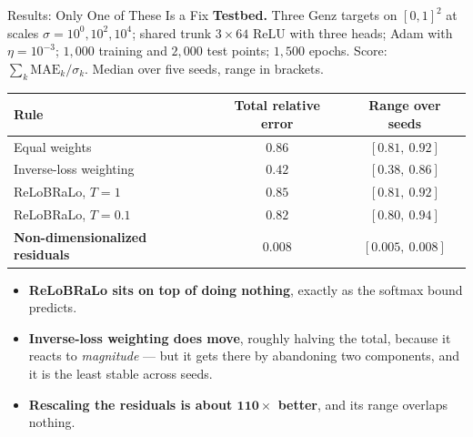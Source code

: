 \documentclass[aspectratio=169,11pt]{beamer}
\newcommand{\emphc}[1]{\textcolor{harvardcrimson}{#1}}
\begin{document}
\begin{frame}{Results: Only One of These Is a Fix}
{\footnotesize \textbf{Testbed.} Three Genz targets on $[0,1]^2$ at scales $\sigma = 10^0, 10^2, 10^4$; shared trunk $3\times64$ ReLU with three heads; Adam with $\eta=10^{-3}$; $1{,}000$ training and $2{,}000$ test points; $1{,}500$ epochs. Score: $\sum_k \mathrm{MAE}_k/\sigma_k$. \emphc{Median over five seeds}, range in brackets.}

\vspace{0.25cm}
\begin{center}
\renewcommand{\arraystretch}{1.15}
\footnotesize
\begin{tabular}{@{}lcc@{}}
\toprule
\textbf{Rule} & \textbf{Total relative error} & \textbf{Range over seeds} \\
\midrule
Equal weights                 & $0.86$ & $[0.81,\ 0.92]$ \\
Inverse-loss weighting        & $0.42$ & $[0.38,\ 0.86]$ \\
ReLoBRaLo, $T=1$              & $0.85$ & $[0.81,\ 0.92]$ \\
ReLoBRaLo, $T=0.1$            & $0.82$ & $[0.80,\ 0.94]$ \\
\midrule
\textbf{Non-dimensionalized residuals} & \emphc{$\bm{0.008}$} & $[0.005,\ 0.008]$ \\
\bottomrule
\end{tabular}
\end{center}

\vspace{0.1cm}
\begin{itemize}\itemsep0pt\footnotesize
    \item \textbf{ReLoBRaLo sits on top of doing nothing}, exactly as the softmax bound predicts.
    \item \textbf{Inverse-loss weighting does move}, roughly halving the total, because it reacts to \emph{magnitude} --- but it gets there by abandoning two components, and it is the least stable across seeds.
    \item \textbf{Rescaling the residuals is about $\bm{110\times}$ better}, and its range overlaps nothing.
\end{itemize}
\end{frame}
\end{document}
